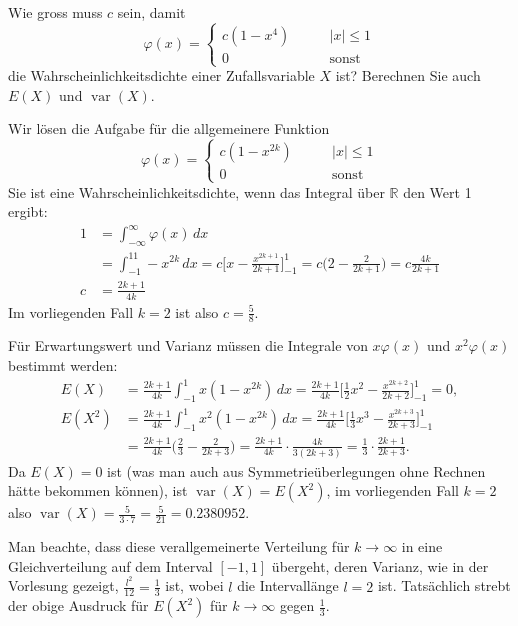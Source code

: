 Wie gross muss $c$ sein, damit
\[
\varphi(x)=\begin{cases}
c(1-x^4)\qquad&|x|\le 1\\
0&\text{sonst}
\end{cases}
\]
die Wahrscheinlichkeitsdichte einer Zufallsvariable $X$ ist? Berechnen 
Sie auch $E(X)$ und $\operatorname{var}(X)$.

\begin{loesung}
Wir lösen die Aufgabe für die allgemeinere Funktion
\[
\varphi(x)=\begin{cases}
c(1-x^{2k})\qquad&|x|\le 1\\
0&\text{sonst}
\end{cases}
\]
Sie ist eine Wahrscheinlichkeitsdichte, wenn das Integral über $\mathbb R$
den Wert 1 ergibt:
\begin{align*}
1&=\int_{-\infty}^{\infty}\varphi(x)\,dx
\\
&=
\int_{-1}^11-x^{2k}\,dx=c\biggl[x-\frac{x^{2k+1}}{2k+1}\biggr]_{-1}^1
=c\biggl(2-\frac{2}{2k+1}\biggr)=c\frac{4k}{2k+1}
\\
c&=\frac{2k+1}{4k}
\end{align*}
Im vorliegenden Fall $k=2$ ist also $c=\frac{5}{8}$.

Für Erwartungswert und Varianz müssen die Integrale von 
$x\varphi(x)$ und $x^2\varphi(x)$ bestimmt werden:
\begin{align*}
E(X)
&=
\frac{2k+1}{4k}
\int_{-1}^1x(1-x^{2k})\,dx
=
\frac{2k+1}{4k}
\biggl[
\frac12x^2-\frac{x^{2k+2}}{2k+2}
\biggr]_{-1}^1=0,
\\
E(X^2)
&=
\frac{2k+1}{4k}\int_{-1}^1x^2(1-x^{2k})\,dx
=
\frac{2k+1}{4k}
\biggl[
\frac13x^3-\frac{x^{2k+3}}{2k+3}
\biggr]_{-1}^1
\\
&=
\frac{2k+1}{4k}
\biggl(
\frac23-\frac{2}{2k+3}
\biggr)
=
\frac{2k+1}{4k}
\cdot
\frac{4k}{3(2k+3)}
=
\frac13\cdot
\frac{2k+1}{2k+3}.
\end{align*}
Da $E(X)=0$ ist (was man auch aus Symmetrieüberlegungen ohne
Rechnen hätte bekommen können), ist $\operatorname{var}(X)=E(X^2)$,
im vorliegenden Fall $k=2$ also 
$\operatorname{var}(X)=\frac{5}{3\cdot 7}=\frac{5}{21}=0.2380952$.

Man beachte, dass diese verallgemeinerte Verteilung für $k\to\infty$
in eine Gleichverteilung auf dem Interval $[-1,1]$ übergeht, deren
Varianz, wie in der Vorlesung gezeigt, $\frac{l^2}{12}=\frac13$ ist, wobei
$l$ die Intervallänge $l=2$ ist. Tatsächlich strebt der obige 
Ausdruck für $E(X^2)$ für $k\to\infty$ gegen $\frac13$.
\end{loesung}
